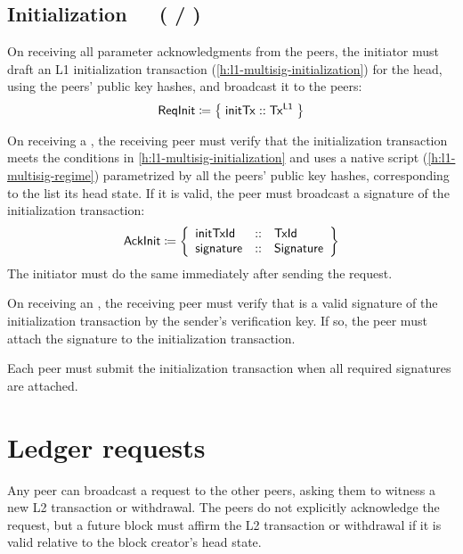 \documentclass[../hydrozoa.tex]{subfiles}
\begin{document}
\subsection{Initialization~~~( / )}%
\label{h:l2-consensus-intitialization}%

On receiving all parameter acknowledgments from the peers, the initiator must draft an L1 initialization transaction (\cref{h:l1-multisig-initialization}) for the head, using the peers' public key hashes, and broadcast it to the peers:
\begin{equation*}
  \mathsf{ReqInit} \coloneq \;\bigr\{\; \mathsf{initTx} :: \mathsf{Tx^{L1}} \;\bigr\}
\end{equation*}

On receiving a , the receiving peer must verify that the initialization transaction meets the conditions in \cref{h:l1-multisig-initialization} and uses a native script (\cref{h:l1-multisig-regime}) parametrized by all the peers' public key hashes, corresponding to the  list its head state.
If it is valid, the peer must broadcast a signature of the initialization transaction:
\begin{equation*}
  \mathsf{AckInit} \coloneq \left\{
  \begin{array}{lll}
    \mathsf{initTxId} &::& \mathsf{TxId} \\
    \mathsf{signature} &::& \mathsf{Signature}
  \end{array}\right\}
\end{equation*}
The initiator must do the same immediately after sending the  request.

On receiving an , the receiving peer must verify that  is a valid signature of the initialization transaction by the sender's verification key.
If so, the peer must attach the signature to the initialization transaction.

Each peer must submit the initialization transaction when all required signatures are attached.

\section{Ledger requests}%
\label{h:l2-consensus-ledger}%

Any peer can broadcast a request to the other peers, asking them to witness a new L2 transaction or withdrawal.
The peers do not explicitly acknowledge the request, but a future block must affirm the L2 transaction or withdrawal if it is valid relative to the block creator's head state.
\end{document}
